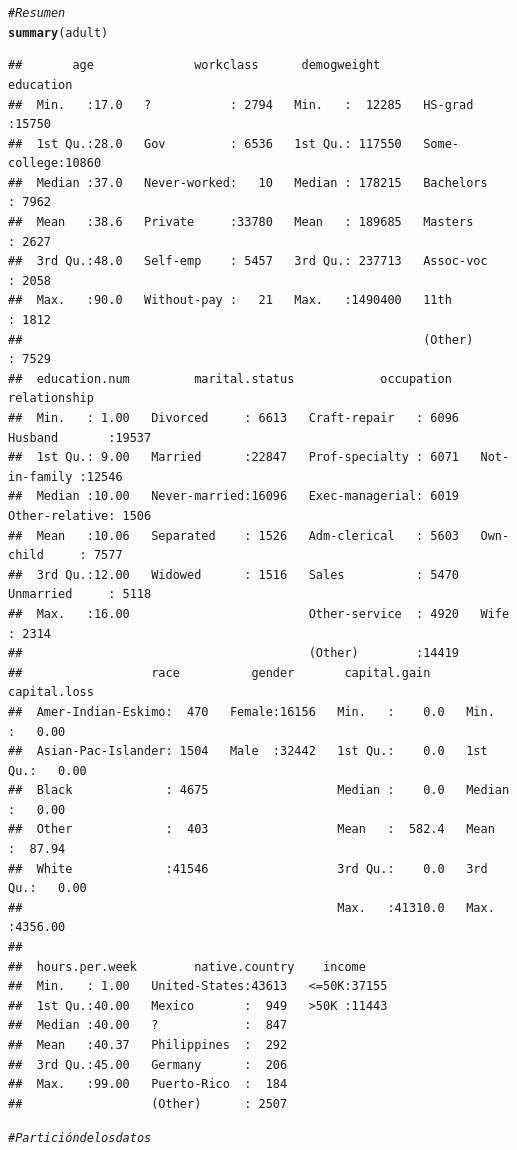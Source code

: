 \documentclass{article}\usepackage[]{graphicx}\usepackage[]{xcolor}
\makeatletter
\newcommand{\hlcom}[1]{\textcolor[rgb]{0.678,0.584,0.686}{\textit{#1}}}%
\newcommand{\hlstd}[1]{\textcolor[rgb]{0.345,0.345,0.345}{#1}}%
\newcommand{\hlkwd}[1]{\textcolor[rgb]{0.737,0.353,0.396}{\textbf{#1}}}%
\newenvironment{kframe}{%
 \def\at@end@of@kframe{}%
 \ifinner\ifhmode%
  \def\at@end@of@kframe{\end{minipage}}%
  \begin{minipage}{\columnwidth}%
 \fi\fi%
 \def\FrameCommand##1{\hskip\@totalleftmargin \hskip-\fboxsep
 \colorbox{shadecolor}{##1}\hskip-\fboxsep
     \hskip-\linewidth \hskip-\@totalleftmargin \hskip\columnwidth}%
 \MakeFramed {\advance\hsize-\width
   \@totalleftmargin\z@ \linewidth\hsize
   \@setminipage}}%
 {\par\unskip\endMakeFramed%
 \at@end@of@kframe}
\newenvironment{knitrout}{}{} %
\makeatother
\begin{document}
\begin{knitrout}
\begin{kframe}
\begin{alltt}
\hlcom{# Resumen}
\hlkwd{summary}\hlstd{(adult)}
\end{alltt}
\begin{verbatim}
##       age              workclass      demogweight             education    
##  Min.   :17.0   ?           : 2794   Min.   :  12285   HS-grad     :15750  
##  1st Qu.:28.0   Gov         : 6536   1st Qu.: 117550   Some-college:10860  
##  Median :37.0   Never-worked:   10   Median : 178215   Bachelors   : 7962  
##  Mean   :38.6   Private     :33780   Mean   : 189685   Masters     : 2627  
##  3rd Qu.:48.0   Self-emp    : 5457   3rd Qu.: 237713   Assoc-voc   : 2058  
##  Max.   :90.0   Without-pay :   21   Max.   :1490400   11th        : 1812  
##                                                        (Other)     : 7529  
##  education.num         marital.status            occupation            relationship  
##  Min.   : 1.00   Divorced     : 6613   Craft-repair   : 6096   Husband       :19537  
##  1st Qu.: 9.00   Married      :22847   Prof-specialty : 6071   Not-in-family :12546  
##  Median :10.00   Never-married:16096   Exec-managerial: 6019   Other-relative: 1506  
##  Mean   :10.06   Separated    : 1526   Adm-clerical   : 5603   Own-child     : 7577  
##  3rd Qu.:12.00   Widowed      : 1516   Sales          : 5470   Unmarried     : 5118  
##  Max.   :16.00                         Other-service  : 4920   Wife          : 2314  
##                                        (Other)        :14419                         
##                  race          gender       capital.gain      capital.loss    
##  Amer-Indian-Eskimo:  470   Female:16156   Min.   :    0.0   Min.   :   0.00  
##  Asian-Pac-Islander: 1504   Male  :32442   1st Qu.:    0.0   1st Qu.:   0.00  
##  Black             : 4675                  Median :    0.0   Median :   0.00  
##  Other             :  403                  Mean   :  582.4   Mean   :  87.94  
##  White             :41546                  3rd Qu.:    0.0   3rd Qu.:   0.00  
##                                            Max.   :41310.0   Max.   :4356.00  
##                                                                               
##  hours.per.week        native.country    income     
##  Min.   : 1.00   United-States:43613   <=50K:37155  
##  1st Qu.:40.00   Mexico       :  949   >50K :11443  
##  Median :40.00   ?            :  847                
##  Mean   :40.37   Philippines  :  292                
##  3rd Qu.:45.00   Germany      :  206                
##  Max.   :99.00   Puerto-Rico  :  184                
##                  (Other)      : 2507
\end{verbatim}
\begin{alltt}
\hlcom{# Partición de los datos }


\end{alltt}
\end{kframe}
\end{knitrout}
\end{document}

